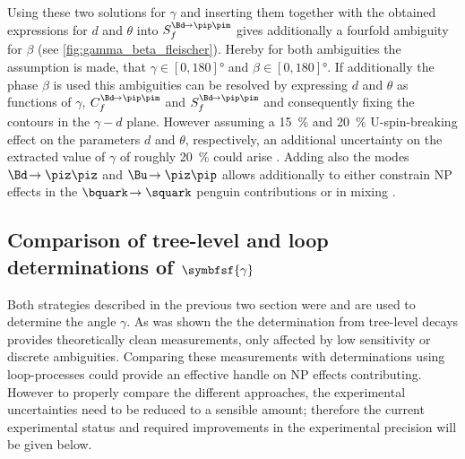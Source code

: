 Using these two solutions for $\gamma$ and inserting them together with the obtained expressions for $d$ and $\theta$ into $S_{f}^{\Bd\!\to\pip\pim}$ gives additionally a fourfold ambiguity for $\beta$ (see \cref{fig:gamma_beta_fleischer}).
Hereby for both ambiguities the assumption is made, that $\gamma\in[0, 180]\si{\degree}$ and $\beta\in[0, 180]\si{\degree}$.
If additionally the phase $\beta$ is used this ambiguities can be resolved by expressing $d$ and $\theta$ as functions of $\gamma$, $C_{f}^{\Bd\!\to\pip\pim}$ and $S_{f}^{\Bd\!\to\pip\pim}$ and consequently fixing the contours in the $\gamma-d$ plane.
However assuming a \SI{15}{\percent} and \SI{20}{\percent} U-spin-breaking effect on the parameters $d$ and $\theta$, respectively, an additional uncertainty on the extracted value of $\gamma$ of roughly \SI{20}{\percent} could arise \cite{GammaInLoops_Fleischer2}.
Adding also the modes $\Bd\!\to\piz\piz$ and $\Bu\!\to\piz\pip$ allows additionally to either constrain \ac{NP} effects in the $\bquark\!\to\squark$ penguin contributions or in mixing \cite{GammaInLoops_Ciuchini}.

\subsection[head={Comparison of tree-level and loop determinations of $\gamma$},tocentry={Comparison of tree-level and loop determinations of $\gamma$}]{Comparison of tree-level and loop determinations of $\symbfsf{\gamma}$}

Both strategies described in the previous two section were and are used to determine the angle $\gamma$.
As was shown the the determination from tree-level decays provides theoretically clean measurements, only affected by low sensitivity or discrete ambiguities.
Comparing these measurements with determinations using loop-processes could provide an effective handle on \ac{NP} effects contributing.
However to properly compare the different approaches, the experimental uncertainties need to be reduced to a sensible amount; therefore the current experimental status and required improvements in the experimental precision will be given below.

